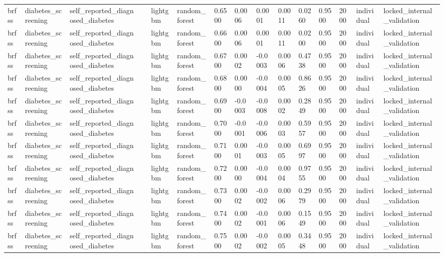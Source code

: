 \begin{tabular}{lllllllllllllll}
brfss & diabetes\_screening & self\_reported\_diagnosed\_diabetes &  & lightgbm & random\_forest & 0.6500 & 0.0006 & 0.0001 & 0.0011 & 0.0260 & 0.9500 & 2000 & individual & locked\_internal\_validation \\
brfss & diabetes\_screening & self\_reported\_diagnosed\_diabetes &  & lightgbm & random\_forest & 0.6600 & 0.0006 & 0.0001 & 0.0011 & 0.0200 & 0.9500 & 2000 & individual & locked\_internal\_validation \\
brfss & diabetes\_screening & self\_reported\_diagnosed\_diabetes &  & lightgbm & random\_forest & 0.6700 & 0.0002 & -0.0003 & 0.0006 & 0.4738 & 0.9500 & 2000 & individual & locked\_internal\_validation \\
brfss & diabetes\_screening & self\_reported\_diagnosed\_diabetes &  & lightgbm & random\_forest & 0.6800 & 0.0000 & -0.0004 & 0.0005 & 0.8626 & 0.9500 & 2000 & individual & locked\_internal\_validation \\
brfss & diabetes\_screening & self\_reported\_diagnosed\_diabetes &  & lightgbm & random\_forest & 0.6900 & -0.0003 & -0.0008 & 0.0002 & 0.2849 & 0.9500 & 2000 & individual & locked\_internal\_validation \\
brfss & diabetes\_screening & self\_reported\_diagnosed\_diabetes &  & lightgbm & random\_forest & 0.7000 & -0.0001 & -0.0006 & 0.0003 & 0.5957 & 0.9500 & 2000 & individual & locked\_internal\_validation \\
brfss & diabetes\_screening & self\_reported\_diagnosed\_diabetes &  & lightgbm & random\_forest & 0.7100 & 0.0001 & -0.0003 & 0.0005 & 0.6997 & 0.9500 & 2000 & individual & locked\_internal\_validation \\
brfss & diabetes\_screening & self\_reported\_diagnosed\_diabetes &  & lightgbm & random\_forest & 0.7200 & 0.0000 & -0.0004 & 0.0004 & 0.9755 & 0.9500 & 2000 & individual & locked\_internal\_validation \\
brfss & diabetes\_screening & self\_reported\_diagnosed\_diabetes &  & lightgbm & random\_forest & 0.7300 & 0.0002 & -0.0002 & 0.0006 & 0.2979 & 0.9500 & 2000 & individual & locked\_internal\_validation \\
brfss & diabetes\_screening & self\_reported\_diagnosed\_diabetes &  & lightgbm & random\_forest & 0.7400 & 0.0002 & -0.0001 & 0.0006 & 0.1549 & 0.9500 & 2000 & individual & locked\_internal\_validation \\
brfss & diabetes\_screening & self\_reported\_diagnosed\_diabetes &  & lightgbm & random\_forest & 0.7500 & 0.0002 & -0.0002 & 0.0005 & 0.3448 & 0.9500 & 2000 & individual & locked\_internal\_validation \\

\end{tabular}
